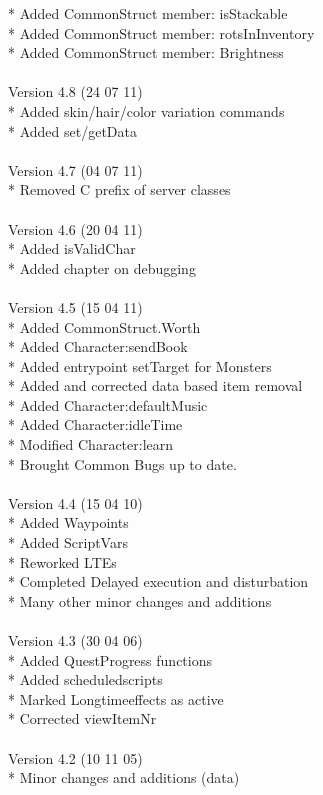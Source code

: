\documentclass[a4paper,10pt,makeidx]{scrreprt}
\begin{document}
* Added CommonStruct member: isStackable\\
* Added CommonStruct member: rotsInInventory\\
* Added CommonStruct member: Brightness\\
\\
Version 4.8 (24 07 11)\\
* Added skin/hair/color variation commands\\
* Added set/getData\\
\\
Version 4.7 (04 07 11)\\
* Removed C prefix of server classes\\
\\
Version 4.6 (20 04 11)\\
* Added isValidChar\\
* Added chapter on debugging\\
\\
Version 4.5 (15 04 11)\\
* Added CommonStruct.Worth\\
* Added Character:sendBook\\
* Added entrypoint setTarget for Monsters\\
* Added and corrected data based item removal\\
* Added Character:defaultMusic\\
* Added Character:idleTime\\
* Modified Character:learn\\
* Brought Common Bugs up to date.\\
\\
Version 4.4 (15 04 10)\\
* Added Waypoints\\
* Added ScriptVars\\
* Reworked LTEs\\
* Completed Delayed execution and disturbation\\
* Many other minor changes and additions\\
\\
Version 4.3 (30 04 06)\\
* Added QuestProgress functions\\
* Added scheduledscripts\\
* Marked Longtimeeffects as active\\
* Corrected viewItemNr\\
\\
Version 4.2 (10 11 05)\\
* Minor changes and additions (data)\\
\end{document}
